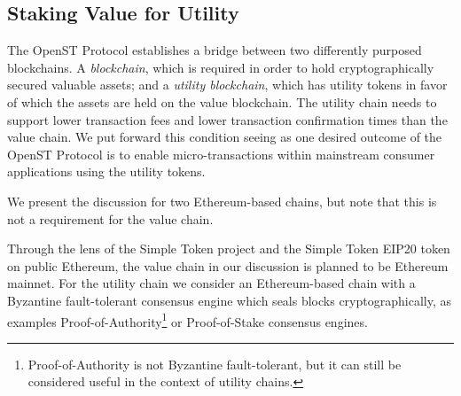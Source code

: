 \documentclass[12pt,a4paper, twocolumn]{article}
\begin{document}
\subsection{Staking Value for Utility}
The OpenST Protocol establishes a bridge between two differently purposed blockchains.  A \textit{blockchain}, which is required in order to hold cryptographically secured valuable assets; and a \textit{utility blockchain}, which has utility tokens in favor of which the assets are held on the value blockchain.  The utility chain needs to support lower transaction fees and lower transaction confirmation times than the value chain.  We put forward this condition seeing as one desired outcome of the OpenST Protocol is to enable micro-transactions within mainstream consumer applications using the utility tokens. \par
We present the discussion for two Ethereum-based chains, but note that this is not a requirement for the value chain. \par
Through the lens of the Simple Token project and the Simple Token EIP20 token on public Ethereum, the value chain in our discussion is planned to be Ethereum mainnet.  For the utility chain we consider an Ethereum-based chain with a Byzantine fault-tolerant consensus engine which seals blocks cryptographically, as examples Proof-of-Authority\footnote{Proof-of-Authority is not Byzantine fault-tolerant, but it can still be considered useful in the context of utility chains.} or Proof-of-Stake consensus engines. \par
\end{document}
